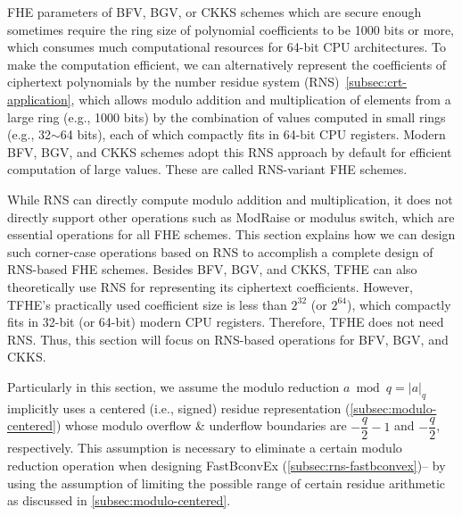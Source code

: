 FHE parameters of BFV, BGV, or CKKS schemes which are secure enough sometimes require the ring size of polynomial coefficients to be 1000 bits or more, which consumes much computational resources for 64-bit CPU architectures. To make the computation efficient, we can alternatively represent the coefficients of ciphertext polynomials by the number residue system (RNS)~\autoref{subsec:crt-application}, which allows modulo addition and multiplication of elements from a large ring (e.g., 1000 bits) by the combination of values computed in small rings (e.g., 32$\sim$64 bits), each of which compactly fits in 64-bit CPU registers. Modern BFV, BGV, and CKKS schemes adopt this RNS approach by default for efficient computation of large values. These are called RNS-variant FHE schemes.  

While RNS can directly compute modulo addition and multiplication, it does not directly support other operations such as \textsf{ModRaise} or modulus switch, which are essential operations for all FHE schemes. This section explains how we can design such corner-case operations based on RNS to accomplish a complete design of RNS-based FHE schemes. Besides BFV, BGV, and CKKS, TFHE can also theoretically use RNS for representing its ciphertext coefficients. However, TFHE's practically used coefficient size is less than $2^{32}$ (or $2^{64}$), which compactly fits in 32-bit (or 64-bit) modern CPU registers. Therefore, TFHE does not need RNS. Thus, this section will focus on RNS-based operations for BFV, BGV, and CKKS. 

Particularly in this section, we assume the modulo reduction $a \bmod q = |a|_q$ implicitly uses a centered (i.e., signed) residue representation (\autoref{subsec:modulo-centered}) whose modulo overflow \& underflow boundaries are $-\dfrac{q}{2} - 1$ and $-\dfrac{q}{2}$, respectively. This assumption is necessary to eliminate a certain modulo reduction operation when designing \textsf{FastBconvEx} (\autoref{subsec:rns-fastbconvex})-- by using the assumption of limiting the possible range of certain residue arithmetic as discussed in \autoref{subsec:modulo-centered}. 

